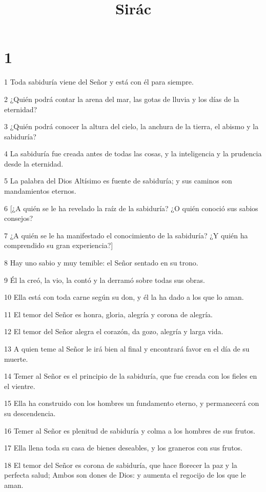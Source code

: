 

\title{Sirác}


\chapter{1}

\par 1 Toda sabiduría viene del Señor y está con él para siempre.
\par 2 ¿Quién podrá contar la arena del mar, las gotas de lluvia y los días de la eternidad?
\par 3 ¿Quién podrá conocer la altura del cielo, la anchura de la tierra, el abismo y la sabiduría?
\par 4 La sabiduría fue creada antes de todas las cosas, y la inteligencia y la prudencia desde la eternidad.
\par 5 La palabra del Dios Altísimo es fuente de sabiduría; y sus caminos son mandamientos eternos.
\par 6 [¿A quién se le ha revelado la raíz de la sabiduría? ¿O quién conoció sus sabios consejos?
\par 7 ¿A quién se le ha manifestado el conocimiento de la sabiduría? ¿Y quién ha comprendido su gran experiencia?]
\par 8 Hay uno sabio y muy temible: el Señor sentado en su trono.
\par 9 Él la creó, la vio, la contó y la derramó sobre todas sus obras.
\par 10 Ella está con toda carne según su don, y él la ha dado a los que lo aman.
\par 11 El temor del Señor es honra, gloria, alegría y corona de alegría.
\par 12 El temor del Señor alegra el corazón, da gozo, alegría y larga vida.
\par 13 A quien teme al Señor le irá bien al final y encontrará favor en el día de su muerte.
\par 14 Temer al Señor es el principio de la sabiduría, que fue creada con los fieles en el vientre.
\par 15 Ella ha construido con los hombres un fundamento eterno, y permanecerá con su descendencia.
\par 16 Temer al Señor es plenitud de sabiduría y colma a los hombres de sus frutos.
\par 17 Ella llena toda su casa de bienes deseables, y los graneros con sus frutos.
\par 18 El temor del Señor es corona de sabiduría, que hace florecer la paz y la perfecta salud; Ambos son dones de Dios: y aumenta el regocijo de los que le aman.
